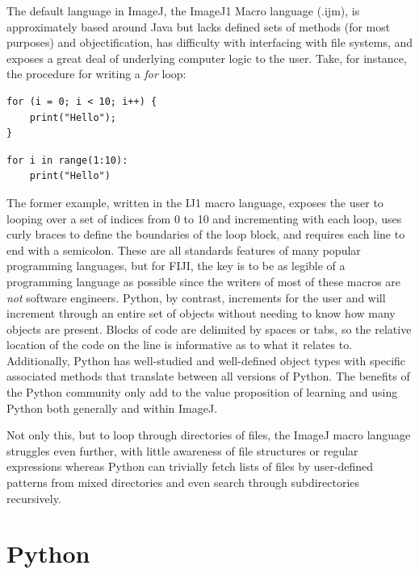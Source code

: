The default language in ImageJ, the ImageJ1 Macro language (.ijm), is approximately based around Java but lacks defined sets of methods (for most purposes) and objectification, has difficulty with interfacing with file systems, and exposes a great deal of underlying computer logic to the user. Take, for instance, the procedure for writing a \textit{for} loop:

\begin{code}
\begin{verbatim}
for (i = 0; i < 10; i++) {
    print("Hello");
}
\end{verbatim}
\end{code}

\begin{code}
\begin{verbatim}
for i in range(1:10):
    print("Hello")
\end{verbatim}
\end{code}

The former example, written in the IJ1 macro language, exposes the user to looping over a set of indices from 0 to 10 and incrementing with each loop, uses curly braces to define the boundaries of the loop block, and requires each line to end with a semicolon. These are all standards features of many popular programming languages, but for FIJI, the key is to be as legible of a programming language as possible since the writers of most of these macros are \textit{not} software engineers. Python, by contrast, increments for the user and will increment through an entire set of objects without needing to know how many objects are present. Blocks of code are delimited by spaces or tabs, so the relative location of the code on the line is informative as to what it relates to. Additionally, Python has well-studied and well-defined object types with specific associated methods that translate between all versions of Python. The benefits of the Python community only add to the value proposition of learning and using Python both generally and within ImageJ.

Not only this, but to loop through directories of files, the ImageJ macro language struggles even further, with little awareness of file structures or regular expressions whereas Python can trivially fetch lists of files by user-defined patterns from mixed directories and even search through subdirectories recursively.
 
\section{Python}\label{python}

